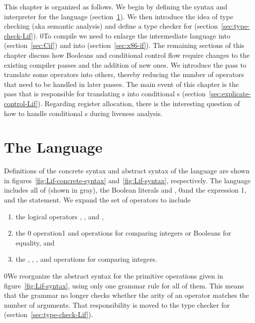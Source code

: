 \documentclass[7x10]{TimesAPriori_MIT}%
\def\racketEd{0}
\def\pythonEd{1}
\providecommand{\BookEdition}{1}
\let\edition\BookEdition
\newcommand{\racket}[1]{{\if\edition\racketEd{#1}\fi}}
\newcommand{\pythonColor}[0]{}
\newcommand{\python}[1]{{\if\edition\pythonEd\pythonColor #1\fi}}
\numberwithin{theorem}{chapter}
\numberwithin{definition}{chapter}
\numberwithin{equation}{chapter}
\begin{document}
This chapter is organized as follows.  We begin by defining the syntax
and interpreter for the \LangIf{} language
(section~\ref{sec:lang-if}). We then introduce the idea of type
checking (aka semantic analysis)
and define a type checker for \LangIf{}
(section~\ref{sec:type-check-Lif}).
%
\racket{To compile \LangIf{} we need to enlarge the intermediate
  language \LangCVar{} into \LangCIf{} (section~\ref{sec:Cif}) and
  \LangXInt{} into \LangXIf{} (section~\ref{sec:x86-if}).}
%
The remaining sections of this chapter discuss how Booleans and
conditional control flow require changes to the existing compiler
passes and the addition of new ones. We introduce the 
pass to translate some operators into others, thereby reducing the
number of operators that need to be handled in later passes.
%
The main event of this chapter is the  pass
that is responsible for translating s into conditional
s (section~\ref{sec:explicate-control-Lif}).
%
Regarding register allocation, there is the interesting question of
how to handle conditional s during liveness analysis.


\section{The \LangIf{} Language}
\label{sec:lang-if}

Definitions of the concrete syntax and abstract syntax of the
\LangIf{} language are shown in figures~\ref{fig:Lif-concrete-syntax}
and~\ref{fig:Lif-syntax}, respectively. The \LangIf{} language
includes all of \LangVar{} {(shown in gray)}, the Boolean
literals
\TRUE{} and \FALSE{}, \racket{and} the  expression%
\python{, and the \code{if} statement}. We expand the set of
operators to include
\begin{enumerate}
\item the logical operators , , and ,
\item the \racket{ operation}\python{\key{==} and \key{!=} operations}
  for comparing integers or Booleans for equality, and
\item the \key{<}, \key{<=},
  \key{>}, and
  \key{>=} operations for
  comparing integers.
\end{enumerate}

\racket{We reorganize the abstract syntax for the primitive
  operations given in figure~\ref{fig:Lif-syntax}, using only one grammar
  rule for all of them. This means that the grammar no longer checks
  whether the arity of an operator matches the number of
  arguments. That responsibility is moved to the type checker for
  \LangIf{} (section~\ref{sec:type-check-Lif}).}
\end{document}
